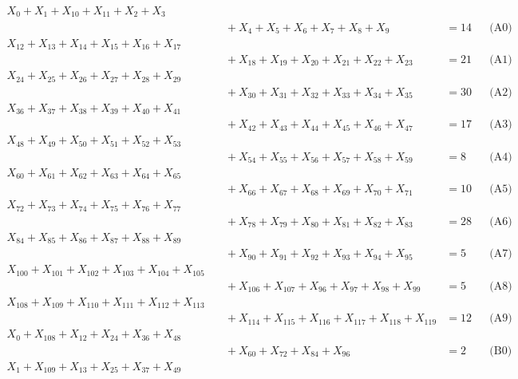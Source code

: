 \documentclass[a4paper,10pt]{article}
\begin{document}
\allowdisplaybreaks
{\small\begin{align}
X_{0} + X_{1} + X_{10} + X_{11} + X_{2} + X_{3} \\[0.5ex]
&\quad  + X_{4} + X_{5} + X_{6} + X_{7} + X_{8} + X_{9} &= 14 && \text{(A0)} \\
X_{12} + X_{13} + X_{14} + X_{15} + X_{16} + X_{17} \\[0.5ex]
&\quad  + X_{18} + X_{19} + X_{20} + X_{21} + X_{22} + X_{23} &= 21 && \text{(A1)} \\
X_{24} + X_{25} + X_{26} + X_{27} + X_{28} + X_{29} \\[0.5ex]
&\quad  + X_{30} + X_{31} + X_{32} + X_{33} + X_{34} + X_{35} &= 30 && \text{(A2)} \\
X_{36} + X_{37} + X_{38} + X_{39} + X_{40} + X_{41} \\[0.5ex]
&\quad  + X_{42} + X_{43} + X_{44} + X_{45} + X_{46} + X_{47} &= 17 && \text{(A3)} \\
X_{48} + X_{49} + X_{50} + X_{51} + X_{52} + X_{53} \\[0.5ex]
&\quad  + X_{54} + X_{55} + X_{56} + X_{57} + X_{58} + X_{59} &= 8 && \text{(A4)} \\
X_{60} + X_{61} + X_{62} + X_{63} + X_{64} + X_{65} \\[0.5ex]
&\quad  + X_{66} + X_{67} + X_{68} + X_{69} + X_{70} + X_{71} &= 10 && \text{(A5)} \\
X_{72} + X_{73} + X_{74} + X_{75} + X_{76} + X_{77} \\[0.5ex]
&\quad  + X_{78} + X_{79} + X_{80} + X_{81} + X_{82} + X_{83} &= 28 && \text{(A6)} \\
X_{84} + X_{85} + X_{86} + X_{87} + X_{88} + X_{89} \\[0.5ex]
&\quad  + X_{90} + X_{91} + X_{92} + X_{93} + X_{94} + X_{95} &= 5 && \text{(A7)} \\
X_{100} + X_{101} + X_{102} + X_{103} + X_{104} + X_{105} \\[0.5ex]
&\quad  + X_{106} + X_{107} + X_{96} + X_{97} + X_{98} + X_{99} &= 5 && \text{(A8)} \\
X_{108} + X_{109} + X_{110} + X_{111} + X_{112} + X_{113} \\[0.5ex]
&\quad  + X_{114} + X_{115} + X_{116} + X_{117} + X_{118} + X_{119} &= 12 && \text{(A9)} \\
X_{0} + X_{108} + X_{12} + X_{24} + X_{36} + X_{48} \\[0.5ex]
&\quad  + X_{60} + X_{72} + X_{84} + X_{96} &= 2 && \text{(B0)} \\
X_{1} + X_{109} + X_{13} + X_{25} + X_{37} + X_{49} \\[0.5ex]

\end{align}}
\end{document}
